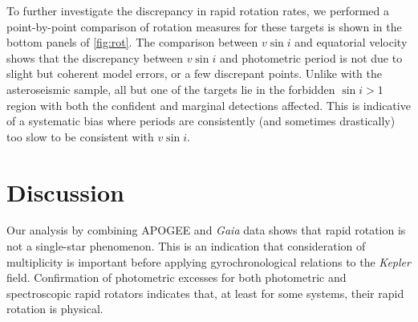 \documentclass[manuscript]{aastex6}
\newcommand{\vsini}{\ensuremath{v \sin i}}
\newcommand{\Kepler}{\mbox{\textit{Kepler}}}
\newcommand{\Gaia}{\mbox{\textit{Gaia}}}
\begin{document}
\begin{figure*}
  \caption{\emph{Left:} APOGEE \vsini{} plotted against equatorial
  velocity computed from the rotation period and radius for targets with
  detected rapid rotation. Targets which are photometric binaries are plotted
  as large circles while targets which are on the single photometric sequence
  are plotted as small stars. The confirmed \vsini{} detections are shown
  in dark blue while the marginal \vsini{} detections are shown in light
  blue. The solid and dashed lines correspond to values where \(\sin i =
  1, 0.5\), respectively. The hatched area represents the forbidden
  region where \(\sin i > 1\). \emph{Middle:} Symbols are similar to left
  side, except points are projected such that the DSEP-derived radius is
  plotted against the radius inferred from \vsini{} and rotation
  period. \emph{Right:} Symbols are similar to left side, except points are
  projected such that the \citet{McQuillan14} period is plotted against the
  period inferred from the \vsini{} and radius.\label{fig:rot}}
\end{figure*}

To further investigate the discrepancy in rapid rotation rates, we
performed a point-by-point comparison of rotation measures for these 
targets is shown in the bottom panels of
\cref{fig:rot}. The comparison between \vsini{} and equatorial velocity shows
that the discrepancy between \vsini{} and photometric period is not due to slight
but coherent model errors, or a few discrepant points. Unlike with the
asteroseismic sample, all but one of the targets
lie in the forbidden \(\sin i > 1\) region with both the confident and
marginal detections affected. This is indicative of a systematic
bias where periods are consistently (and sometimes drastically) too slow to be
consistent with \vsini{}.

\section{Discussion}
\label{sec:discussion}

Our analysis by combining APOGEE and \Gaia{} data shows that rapid
rotation is not a single-star phenomenon. This is an indication that
consideration of multiplicity is important before applying gyrochronological
relations to the \Kepler{} field. Confirmation of photometric excesses for 
both photometric and spectroscopic rapid rotators indicates that, at least
for some systems, their rapid rotation is physical.
\end{document}
